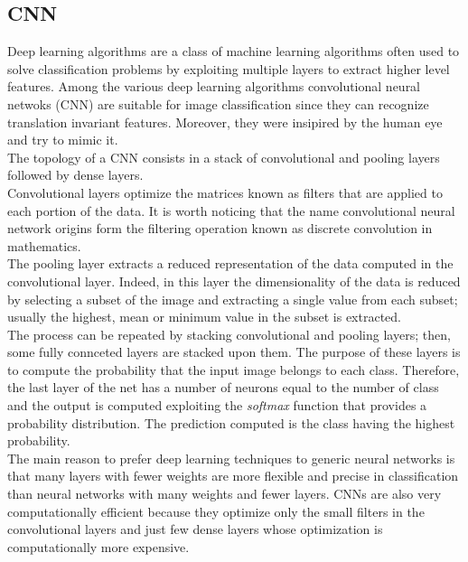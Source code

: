 \documentclass{article}
\begin{document}
\subsection{CNN} \label{sec:cnn}
Deep learning algorithms are a class of machine learning algorithms often used to solve classification problems by exploiting multiple layers to extract higher level features. Among the various deep learning algorithms convolutional neural netwoks (CNN) are suitable for image classification since they can recognize translation invariant features. Moreover, they were insipired by the human eye and try to mimic it. \\
The topology of a  CNN consists in a stack of convolutional and pooling layers followed by dense layers. \\
Convolutional layers optimize the matrices known as filters that are applied to each portion of the data. It is worth noticing that the name convolutional neural network origins form the filtering operation known as discrete convolution in mathematics. \\ 
The pooling layer extracts a reduced representation of the data computed in the convolutional layer. Indeed, in this layer the dimensionality of the data is reduced by selecting a subset of the image and extracting a single value from each subset; usually the highest, mean or minimum value in the subset is extracted. \\
The process can be repeated by stacking convolutional and pooling layers; then, some fully connceted layers are stacked upon them. The purpose of these layers is to compute the probability that the input image belongs to each class. Therefore, the last layer of the net has a number of neurons equal to the number of class and the output is computed exploiting the \textit{softmax} function that provides a probability distribution. The prediction computed is the class having the highest probability. \\
The main reason to prefer deep learning techniques to generic neural networks is that many layers with fewer weights are more flexible and precise in classification than neural networks with many weights and fewer layers. CNNs are also very computationally efficient because they optimize only the small filters in the convolutional layers and just few dense layers whose optimization is computationally more expensive. \\

\newpage
\end{document}
